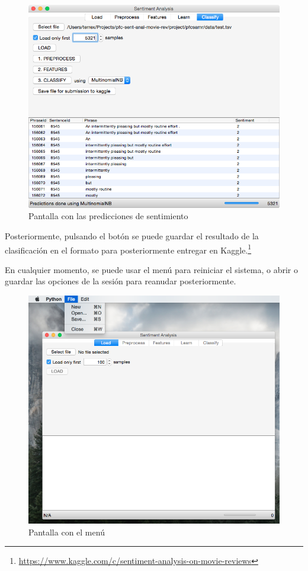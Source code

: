 \begin{figure}[H]
\centering
\includegraphics[width=14cm]{ss-11-classify-test-predictions}
\caption{Pantalla con las predicciones de sentimiento}
\label{fig:ss-11-classify-test-predictions}
\end{figure}

Posteriormente, pulsando el botón  se puede guardar el resultado de la clasificación en el formato  para posteriormente entregar en Kaggle.\footnote{\url{https://www.kaggle.com/c/sentiment-analysis-on-movie-reviews}}

\newpage
En cualquier momento, se puede usar el menú  para reiniciar el sistema, o abrir o guardar las opciones de la sesión para reanudar posteriormente.

\begin{figure}[H]
\centering
\includegraphics[width=\textwidth]{ss-12-menu-file}
\caption[Pantalla con el menú ]{Pantalla con el menú }
\label{fig:ss-12-menu-file}
\end{figure}

